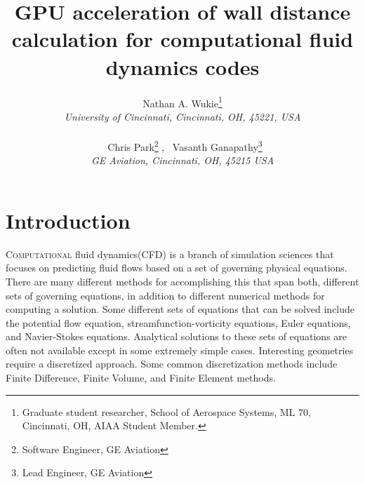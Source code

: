 \documentclass[]{aiaa-tc}%
\title{GPU acceleration of wall distance calculation for
   computational fluid dynamics codes}
\author{
   Nathan A. Wukie\thanks{Graduate student researcher, School of Aerospace Systems, ML 70, 
     Cincinnati, OH, AIAA Student Member.}\\
   {\normalsize\itshape
     University of Cincinnati, Cincinnati, OH, 45221, USA}\\\\
   \ Chris Park\thanks{Software Engineer, GE Aviation} ,
   \ Vasanth Ganapathy\thanks{Lead Engineer, GE Aviation} \\
   {\normalsize\itshape
     GE Aviation, Cincinnati, OH, 45215 USA}\\
 }
\begin{document}
\maketitle




\section{Introduction}
\lettrine[nindent=0pt]{C}{omputational} fluid dynamics(CFD) is a branch of
simulation sciences that focuses on predicting fluid flows based on a
set of governing physical equations. There are many different methods
for accomplishing this that span both, different sets of governing
equations, in addition to different numerical methods for computing a
solution. Some different sets of equations that can be solved include
the potential flow equation, streamfunction-vorticity equations, Euler
equations, and Navier-Stokes equations. Analytical solutions to these
sets of equations are often not available except in some extremely
simple cases. Interesting geometries require a discretized
approach. Some common discretization methods include Finite Difference,
Finite Volume, and Finite Element methods. 
\end{document}
